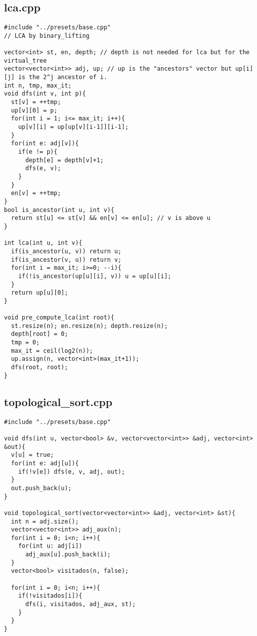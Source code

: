 \documentclass[11pt,landscape,twocolumn]{article}
\begin{document}
\subsection*{lca.cpp}
\begin{lstlisting}
#include "../presets/base.cpp"
// LCA by binary_lifting

vector<int> st, en, depth; // depth is not needed for lca but for the virtual_tree
vector<vector<int>> adj, up; // up is the "ancestors" vector but up[i][j] is the 2^j ancestor of i.
int n, tmp, max_it;
void dfs(int v, int p){
  st[v] = ++tmp;  
  up[v][0] = p;
  for(int i = 1; i<= max_it; i++){
    up[v][i] = up[up[v][i-1]][i-1];
  }
  for(int e: adj[v]){
    if(e != p){
      depth[e] = depth[v]+1;
      dfs(e, v);
    }
  }
  en[v] = ++tmp;
}
bool is_ancestor(int u, int v){
  return st[u] <= st[v] && en[v] <= en[u]; // v is above u
}

int lca(int u, int v){
  if(is_ancestor(u, v)) return u;
  if(is_ancestor(v, u)) return v;
  for(int i = max_it; i>=0; --i){
    if(!is_ancestor(up[u][i], v)) u = up[u][i];
  }
  return up[u][0];
}

void pre_compute_lca(int root){
  st.resize(n); en.resize(n); depth.resize(n);
  depth[root] = 0;
  tmp = 0;
  max_it = ceil(log2(n));
  up.assign(n, vector<int>(max_it+1));
  dfs(root, root);
}
\end{lstlisting}

\subsection*{topological\_sort.cpp}
\begin{lstlisting}
#include "../presets/base.cpp"

void dfs(int u, vector<bool> &v, vector<vector<int>> &adj, vector<int> &out){
  v[u] = true;
  for(int e: adj[u]){
    if(!v[e]) dfs(e, v, adj, out);
  }
  out.push_back(u);
}

void topological_sort(vector<vector<int>> &adj, vector<int> &st){
  int n = adj.size();
  vector<vector<int>> adj_aux(n);
  for(int i = 0; i<n; i++){
    for(int u: adj[i])
      adj_aux[u].push_back(i);
  }
  vector<bool> visitados(n, false);

  for(int i = 0; i<n; i++){
    if(!visitados[i]){
      dfs(i, visitados, adj_aux, st);
    }
  }
}

\end{lstlisting}
\end{document}
